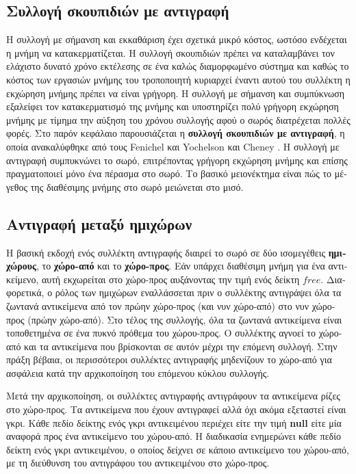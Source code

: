 \begin{greek}
\chapter{Συλλογή σκουπιδιών με αντιγραφή}\label{ch:cop}
Η συλλογή με σήμανση και εκκαθάριση έχει σχετικά μικρό κόστος,
ωστόσο ενδέχεται η μνήμη να κατακερματίζεται. Η συλλογή σκουπιδιών
πρέπει να καταλαμβάνει τον ελάχιστο δυνατό χρόνο εκτέλεσης σε
ένα καλώς διαμορφωμένο σύστημα και καθώς το κόστος των εργασιών 
μνήμης του τροποποιητή κυριαρχεί έναντι αυτού του συλλέκτη η
εκχώρηση μνήμης πρέπει να είναι γρήγορη. Η συλλογή με σήμανση
και συμπύκνωση εξαλείφει τον κατακερματισμό της μνήμης και 
υποστηρίζει πολύ γρήγορη εκχώρηση μνήμης με τίμημα την αύξηση 
του χρόνου συλλογής αφού ο σωρός διατρέχεται πολλές φορές. Στο 
παρόν κεφάλαιο παρουσιάζεται η \textbf{συλλογή σκουπιδιών με 
αντιγραφή}, η οποία ανακαλύφθηκε 
από τους Fenichel και Yochelson \cite{DBLP:journals/cacm/FenichelY69} 
και Cheney \cite{DBLP:journals/cacm/Cheney70}. Η συλλογή με 
αντιγραφή συμπυκνώνει το σωρό, επιτρέποντας γρήγορη εκχώρηση
μνήμης και επίσης πραγματοποιεί μόνο ένα πέρασμα στο σωρό. Το 
βασικό μειονέκτημα είναι πώς το μέγεθος της διαθέσιμης μνήμης 
στο σωρό μειώνεται στο μισό.

\section{Αντιγραφή μεταξύ ημιχώρων}
Η βασική εκδοχή ενός συλλέκτη αντιγραφής διαιρεί το σωρό σε δύο 
ισομεγέθεις \textbf{ημιχώρους}, το \textbf{χώρο-από} και το \textbf{χώρο-προς}.
Εάν υπάρχει διαθέσιμη μνήμη για ένα αντικείμενο, αυτή εκχωρείται στο χώρο-προς 
αυξάνοντας την τιμή ενός δείκτη $free$. Διαφορετικά, ο ρόλος των 
ημιχώρων εναλλάσσεται πριν ο συλλέκτης αντιγράψει όλα τα ζωντανά 
αντικείμενα από τον πρώην χώρο-προς (και νυν χώρο-από) στο νυν 
χώρο-προς (πρώην χώρο-από). Στο τέλος της συλλογής, όλα τα ζωντανά 
αντικείμενα είναι τοποθετημένα σε ένα πυκνό πρόθεμα του χώρου-προς. 
Ο συλλέκτης αγνοεί το χώρο-από και τα αντικείμενα που βρίσκονται σε 
αυτόν μέχρι την επόμενη συλλογή. Στην πράξη βέβαια, οι περισσότεροι 
συλλέκτες αντιγραφής μηδενίζουν το χώρο-από για ασφάλεια κατά την
αρχικοποίηση του επόμενου κύκλου συλλογής. 

Μετά την αρχικοποίηση, οι συλλέκτες αντιγραφής αντιγράφουν τα 
αντικείμενα ρίζες στο χώρο-προς. Τα αντικείμενα που έχουν αντιγραφεί 
αλλά όχι ακόμα εξεταστεί είναι γκρι. Κάθε πεδίο δείκτης ενός 
γκρι αντικειμένου περιέχει είτε την τιμή \textbf{null} είτε μία 
αναφορά προς ένα αντικείμενο του χώρου-από. Η διαδικασία \textenglish{}
ενημερώνει κάθε πεδίο δείκτη ενός γκρι αντικειμένου, ο οποίος 
δείχνει σε κάποιο αντικείμενο του χώρου-από, με τη διεύθυνση 
του αντιγράφου του αντικειμένου στο χώρο-προς. 


\end{greek}
